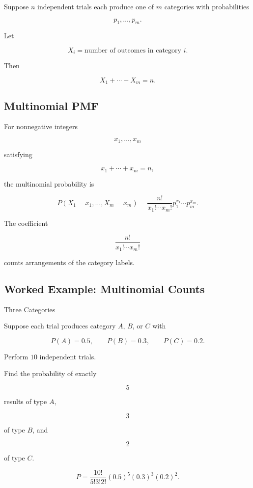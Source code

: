 Suppose \(n\) independent trials each produce one of \(m\) categories
with probabilities

\[
p_1,\ldots,p_m.
\]

Let

\[
X_i
=
\text{number of outcomes in category }i.
\]

Then

\[
X_1+\cdots+X_m=n.
\]

\subsection{Multinomial PMF}
\label{subsec:multinomial-pmf}

For nonnegative integers

\[
x_1,\ldots,x_m
\]

satisfying

\[
x_1+\cdots+x_m=n,
\]

the multinomial probability is

\[
\boxed{
P(X_1=x_1,\ldots,X_m=x_m)
=
\frac{n!}{x_1!\cdots x_m!}
p_1^{x_1}\cdots p_m^{x_m}.
}
\]

The coefficient

\[
\frac{n!}{x_1!\cdots x_m!}
\]

counts arrangements of the category labels.

\subsection{Worked Example: Multinomial Counts}
\label{subsec:worked-multinomial}

\begin{workedexamplebox}{Three Categories}

Suppose each trial produces category \(A\), \(B\), or \(C\) with

\[
P(A)=0.5,
\qquad
P(B)=0.3,
\qquad
P(C)=0.2.
\]

Perform \(10\) independent trials.

Find the probability of exactly

\[
5
\]

results of type \(A\),

\[
3
\]

of type \(B\), and

\[
2
\]

of type \(C\).

\begin{answerbox}
\[
\boxed{
P
=
\frac{10!}{5!3!2!}
(0.5)^5
(0.3)^3
(0.2)^2.
}
\]
\end{answerbox}

\end{workedexamplebox}

